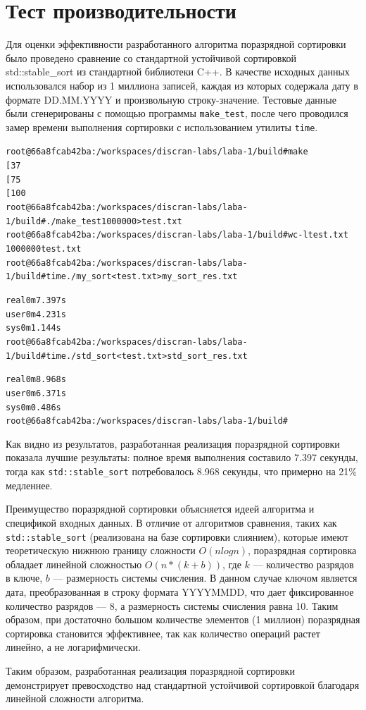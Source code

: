 \section{Тест производительности}
Для оценки эффективности разработанного алгоритма поразрядной сортировки было проведено сравнение
со стандартной устойчивой сортировкой std::stable\_sort из стандартной библиотеки C++. В качестве
исходных данных использовался набор из 1 миллиона записей, каждая из которых содержала дату в формате
DD.MM.YYYY и произвольную строку-значение. Тестовые данные были сгенерированы с помощью программы
\texttt{make\_test}, после чего проводился замер времени выполнения сортировки с использованием утилиты
\texttt{time}.

\begin{alltt}
root@66a8fcab42ba:/workspaces/discran-labs/laba-1/build# make
[ 37%
[ 75%
[100%
root@66a8fcab42ba:/workspaces/discran-labs/laba-1/build# ./make_test 1000000 > test.txt
root@66a8fcab42ba:/workspaces/discran-labs/laba-1/build# wc -l test.txt
1000000 test.txt
root@66a8fcab42ba:/workspaces/discran-labs/laba-1/build# time ./my_sort < test.txt > my_sort_res.txt

real    0m7.397s
user    0m4.231s
sys     0m1.144s
root@66a8fcab42ba:/workspaces/discran-labs/laba-1/build# time ./std_sort < test.txt > std_sort_res.txt

real    0m8.968s
user    0m6.371s
sys     0m0.486s
root@66a8fcab42ba:/workspaces/discran-labs/laba-1/build# 
\end{alltt}

Как видно из результатов, разработанная реализация поразрядной сортировки показала лучшие результаты:
полное время выполнения составило 7.397 секунды, тогда как \texttt{std::stable\_sort} потребовалось 8.968 секунды,
что примерно на 21\% медленнее.

Преимущество поразрядной сортировки объясняется идеей алгоритма и спецификой входных данных. В отличие от алгоритмов
сравнения, таких как \texttt{std::stable\_sort} (реализована на базе сортировки слиянием), которые имеют теоретическую
нижнюю границу сложности $O(n log n)$, поразрядная сортировка обладает линейной сложностью $O(n * (k + b))$, где $k$ --- количество
разрядов в ключе, $b$ --- размерность системы счисления. В данном случае ключом является дата, преобразованная в строку формата YYYYMMDD,
что дает фиксированное количество разрядов --- 8, а размерность системы счисления равна 10. Таким образом, при достаточно большом
количестве элементов (1 миллион) поразрядная сортировка становится эффективнее, так как количество операций растет линейно, а не логарифмически.

Таким образом, разработанная реализация поразрядной сортировки демонстрирует превосходство над стандартной устойчивой
сортировкой благодаря линейной сложности алгоритма.

\pagebreak

